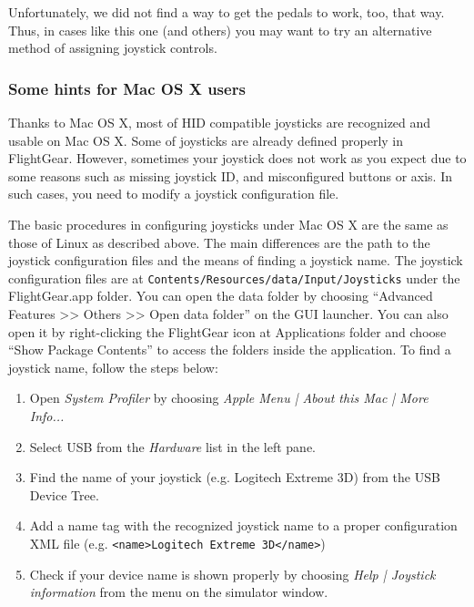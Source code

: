 {Unfortunately, we did not find a way to get the pedals to work, too, that way. Thus, in cases like this one (and others) you may want to try an alternative method of assigning joystick controls.

\subsubsection{Some hints for Mac OS X users\label{joymac}}
Thanks to Mac OS X, most of HID compatible joysticks are recognized and usable on Mac OS X. Some of joysticks are already defined properly in FlightGear. However, sometimes your joystick does not work as you expect due to some reasons such as missing joystick ID, and misconfigured buttons or axis. In such cases, you need to modify a joystick configuration file.

The basic procedures in configuring joysticks under Mac OS X are the same as those of Linux as described above. The main differences are the path to the joystick configuration files and the means of finding a joystick name. The joystick configuration files are at \texttt{Contents/Resources/data/Input/Joysticks} under the FlightGear.app folder. You can open the data folder by choosing ``Advanced Features >> Others >> Open data folder'' on the GUI launcher. You can also open it by right-clicking the FlightGear icon at Applications folder and choose ``Show Package Contents'' to access the folders inside the application. To find a joystick name, follow the steps below:

\begin{enumerate}
\item Open \textit{System Profiler} by choosing \textit{Apple Menu | About this Mac | More Info...}
\item Select USB from the \textit{Hardware} list in the left pane.
\item Find the name of your joystick (e.g. Logitech Extreme 3D) from the USB Device Tree.
\item Add a name tag with the recognized joystick name to a proper configuration XML file (e.g. \verb=<name>Logitech Extreme 3D</name>=)
\item Check if your device name is shown properly by choosing \textit{Help | Joystick information} from the menu on the \FlightGear{} simulator window.
\end{enumerate}

}
